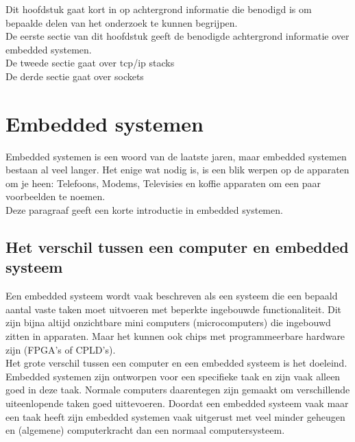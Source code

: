 \documentclass[../DCM2_Verslag.tex]{subfiles}
\begin{document}
Dit hoofdstuk gaat kort in op achtergrond informatie die benodigd is om bepaalde delen van het onderzoek te kunnen begrijpen.
\\
De eerste sectie van dit hoofdstuk geeft de benodigde achtergrond informatie over embedded systemen.
\\
De tweede sectie gaat over tcp/ip stacks
\\
De derde sectie gaat over sockets

\section{Embedded systemen}
Embedded systemen is een woord van de laatste jaren, maar embedded systemen bestaan al veel langer. Het enige wat nodig is, is een blik werpen op de apparaten om je heen: Telefoons, Modems, Televisies en koffie apparaten om een paar voorbeelden te noemen. 
\\
Deze paragraaf geeft een korte introductie in embedded systemen.

\subsection{Het verschil tussen een computer en embedded systeem}
Een embedded systeem wordt vaak beschreven als een systeem die een bepaald aantal vaste taken moet uitvoeren met beperkte ingebouwde functionaliteit. Dit zijn bijna altijd onzichtbare mini computers (microcomputers) die ingebouwd zitten in apparaten. Maar het kunnen ook chips met programmeerbare hardware zijn (FPGA's of CPLD's). 
\\
Het grote verschil tussen een computer en een embedded systeem is het doeleind. Embedded systemen zijn ontworpen voor een specifieke taak en zijn vaak alleen goed in deze taak. Normale computers daarentegen zijn gemaakt om verschillende uiteenlopende taken goed uittevoeren. Doordat een embedded systeem vaak maar een taak heeft zijn embedded systemen vaak uitgerust met veel minder geheugen en (algemene) computerkracht dan een normaal computersysteem.
\end{document}

